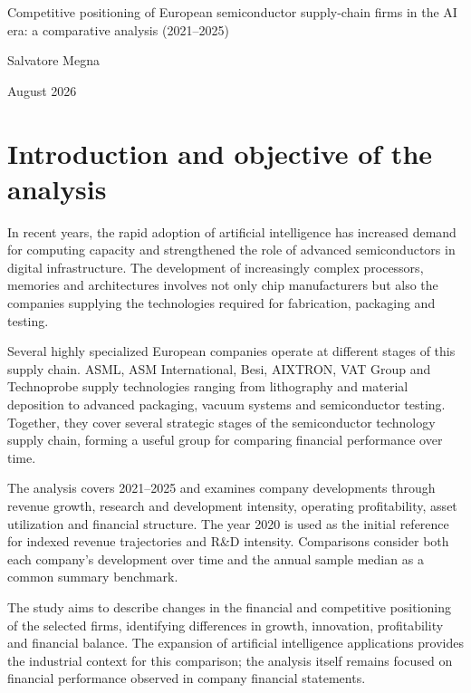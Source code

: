 \documentclass[11pt,a4paper]{article}
\begin{document}
\begin{center}
{\LARGE Competitive positioning of European semiconductor supply-chain firms in the AI era: a comparative analysis (2021--2025)}

\vspace{0.7cm}
{\large Salvatore Megna}

\vspace{0.25cm}
August 2026
\end{center}

\vspace{0.5cm}

\section{Introduction and objective of the analysis}

In recent years, the rapid adoption of artificial intelligence has increased demand for computing capacity and strengthened the role of advanced semiconductors in digital infrastructure. The development of increasingly complex processors, memories and architectures involves not only chip manufacturers but also the companies supplying the technologies required for fabrication, packaging and testing.

Several highly specialized European companies operate at different stages of this supply chain. ASML, ASM International, Besi, AIXTRON, VAT Group and Technoprobe supply technologies ranging from lithography and material deposition to advanced packaging, vacuum systems and semiconductor testing. Together, they cover several strategic stages of the semiconductor technology supply chain, forming a useful group for comparing financial performance over time.

The analysis covers 2021--2025 and examines company developments through revenue growth, research and development intensity, operating profitability, asset utilization and financial structure. The year 2020 is used as the initial reference for indexed revenue trajectories and R\&D intensity. Comparisons consider both each company's development over time and the annual sample median as a common summary benchmark.

The study aims to describe changes in the financial and competitive positioning of the selected firms, identifying differences in growth, innovation, profitability and financial balance. The expansion of artificial intelligence applications provides the industrial context for this comparison; the analysis itself remains focused on financial performance observed in company financial statements.
\end{document}

